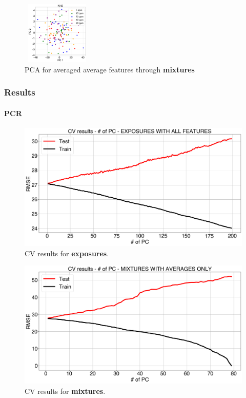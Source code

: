 \documentclass{beamer}
\begin{document}
\begin{frame}
\begin{figure}[h]
			\hfill
			\includegraphics[width=0.30\textwidth, height = 3cm, keepaspectratio]{../../figures/pcaNH3-avg-feat.png}
			\caption{PCA for averaged average features through \textbf{mixtures}}
		\end{figure}
		
\end{frame}


\begin{frame}
	\frametitle{Results}
	\framesubtitle{PCR}
		
		\begin{figure}[t]
			\includegraphics[width=0.5\linewidth]{../../figures/pcr-cv.png}
			\caption{CV results for \textbf{exposures}.}
			\label{fig:pcr-cv} 
		\end{figure}
		
		\begin{figure}[t]
			\includegraphics[width=0.5\linewidth]{../../figures/pcr-cv-avg-feat.png}
			\caption{CV results for \textbf{mixtures}.}
			\label{fig:pcr-cv-averaged}
		\end{figure}
	
\end{frame}
\end{document}
